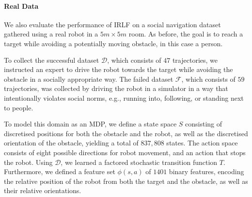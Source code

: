 \documentclass[letterpaper]{article}
\newcommand{\jm}[1]{\textcolor{blue}{Joao: #1}}
\newcommand{\jm}[1]{}
\begin{document}


\vspace{-4.mm}
\paragraph{Real Data}
We also evaluate the performance of IRLF on a social navigation dataset gathered using a real robot in a $5m \times 5m$ room.  As before, the goal is to reach a target while avoiding a potentially moving obstacle, in this case a person. 

To collect the successful dataset $\mathcal{D}$, which consists of $47$ trajectories, we instructed an expert to drive the robot towards the target while avoiding the obstacle in a socially appropriate way. The failed dataset $\mathcal{F}$, which consists of $59$ trajectories, was collected by driving the robot in a simulator in a way that intentionally violates social norms, e.g., running into, following, or standing next to people.


To model this domain as an MDP, we define a state space $S$ consisting of discretised positions for both the obstacle and the robot, as well as the discretised orientation of the obstacle, yielding a total of $837,808$ states. The action space consists of eight possible directions for robot movement, and an action that stops the robot. Using $\mathcal{D}$, we learned a factored stochastic transition function $T$. Furthermore, we defined a feature set $\phi(s,a)$ of $1401$ binary features, encoding the relative position of the robot from both the target and the obstacle, as well as their relative orientations. 
\end{document}
